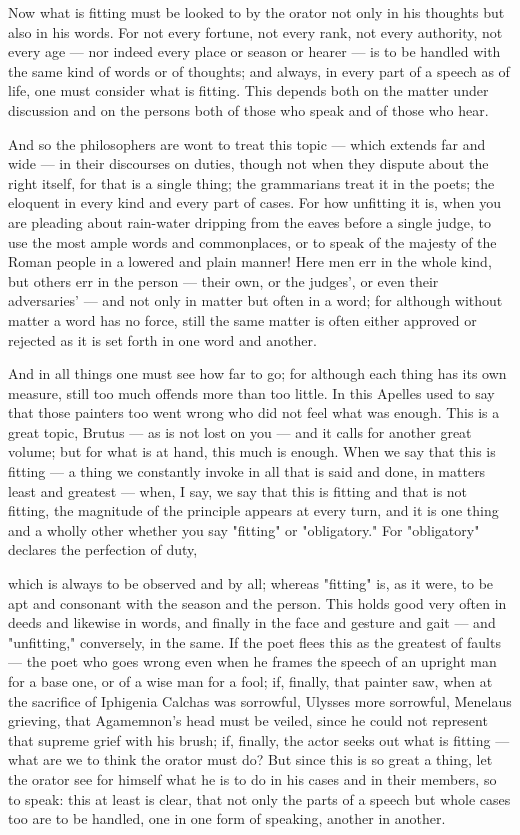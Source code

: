  Now what is fitting must be looked to by the orator not only in his thoughts but also in his words. For not every fortune, not every rank, not every authority, not every age — nor indeed every place or season or hearer — is to be handled with the same kind of words or of thoughts; and always, in every part of a speech as of life, one must consider what is fitting. This depends both on the matter under discussion and on the persons both of those who speak and of those who hear.

 And so the philosophers are wont to treat this topic — which extends far and wide — in their discourses on duties, though not when they dispute about the right itself, for that is a single thing; the grammarians treat it in the poets; the eloquent in every kind and every part of cases. For how unfitting it is, when you are pleading about rain-water dripping from the eaves before a single judge, to use the most ample words and commonplaces, or to speak of the majesty of the Roman people in a lowered and plain manner! Here men err in the whole kind, but others err in the person — their own, or the judges', or even their adversaries' — and not only in matter but often in a word; for although without matter a word has no force, still the same matter is often either approved or rejected as it is set forth in one word and another.

 And in all things one must see how far to go; for although each thing has its own measure, still too much offends more than too little. In this Apelles used to say that those painters too went wrong who did not feel what was enough. This is a great topic, Brutus — as is not lost on you — and it calls for another great volume; but for what is at hand, this much is enough. When we say that this is fitting — a thing we constantly invoke in all that is said and done, in matters least and greatest — when, I say, we say that this is fitting and that is not fitting, the magnitude of the principle appears at every turn, and it is one thing and a wholly other whether you say "fitting" or "obligatory." For "obligatory" declares the perfection of duty,

 which is always to be observed and by all; whereas "fitting" is, as it were, to be apt and consonant with the season and the person. This holds good very often in deeds and likewise in words, and finally in the face and gesture and gait — and "unfitting," conversely, in the same. If the poet flees this as the greatest of faults — the poet who goes wrong even when he frames the speech of an upright man for a base one, or of a wise man for a fool; if, finally, that painter saw, when at the sacrifice of Iphigenia Calchas was sorrowful, Ulysses more sorrowful, Menelaus grieving, that Agamemnon's head must be veiled, since he could not represent that supreme grief with his brush; if, finally, the actor seeks out what is fitting — what are we to think the orator must do? But since this is so great a thing, let the orator see for himself what he is to do in his cases and in their members, so to speak: this at least is clear, that not only the parts of a speech but whole cases too are to be handled, one in one form of speaking, another in another.

